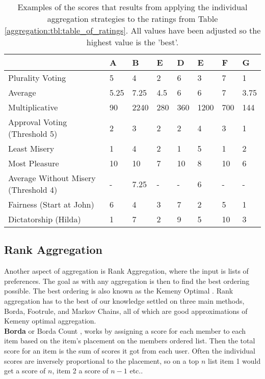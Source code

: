 \begin{table}[H]
	\centering
	\begin{tabular}{ | p{2.5cm} | p{1cm} | p{1cm} | p{1cm} | p{1cm} | p{1cm} | p{1cm} | p{1cm} | } \hline
		& \textbf{A} & \textbf{B} & \textbf{E} & \textbf{D} & \textbf{E} & \textbf{F} & \textbf{G}  \\ \hline
		Plurality Voting & 5 & 4 & 2 & 6 & 3 & 7 & 1 \\ \hline
		Average & 5.25 & 7.25 & 4.5 & 6 & 6 & 7 & 3.75 \\ \hline
		Multiplicative & 90 & 2240 & 280 & 360 & 1200 & 700 & 144 \\ \hline
		Approval Voting (Threshold 5) & 2 & 3 & 2 & 2 & 4 & 3 & 1 \\ \hline
		Least Misery & 1 & 4 & 2 & 1 & 5 & 1 & 2 \\ \hline
		Most Pleasure & 10 & 10 & 7 & 10 & 8 & 10 & 6 \\ \hline
		Average Without Misery (Threshold 4) & - & 7.25 & - & - & 6 & - & - \\ \hline
		Fairness (Start at John) & 6 & 4 & 3 & 7 & 2 & 5 & 1 \\ \hline
		Dictatorship (Hilda) & 1 & 7 & 2 & 9 & 5 & 10 & 3 \\ \hline
	\end{tabular}
	\caption{Examples of the scores that results from applying the individual aggregation strategies to the ratings from Table \ref{aggregation:tbl:table_of_ratings}. All values have been adjusted so the highest value is the 'best'.}
	\label{aggregation:tbl:examples_of_strategies}
\end{table}

\subsection{Rank Aggregation}
Another aspect of aggregation is Rank Aggregation, where the input is lists of preferences. The goal as with any aggregation is then to find the best ordering possible. The best ordering is also known as the Kemeny Optimal \cite{DBLP:conf/www/DworkKNS01}.
Rank aggregation has to the best of our knowledge settled on three main methods, Borda, Footrule, and Markov Chains, all of which are good approximations of Kemeny optimal aggregation.\\


\textbf{Borda} or Borda Count \cite{baltrunas} \cite{recsyshandbook}, works by assigning a score for each member to each item based on the item's placement on the members ordered list. Then the total score for an item is the sum of scores it got from each user. Often the individual scores are inversely proportional to the placement, so on a top $n$ list item 1 would get a score of $n$, item 2 a score of $n-1$ etc..\\

